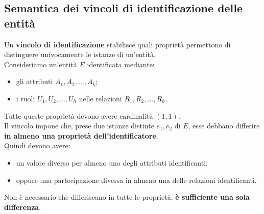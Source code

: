 \subsection*{Semantica dei vincoli di identificazione delle entità}

Un \textbf{vincolo di identificazione} stabilisce quali
proprietà permettono di distinguere univocamente
le istanze di un'entità.\\
Consideriamo un'entità $E$ identificata mediante:
\begin{itemize}
    \item gli attributi $A_1,A_2,\ldots,A_k$;
    \item i ruoli $U_1,U_2,\ldots,U_h$ nelle relazioni
    $R_1,R_2,\ldots,R_h$.
\end{itemize}
\noindent
Tutte queste proprietà devono avere cardinalità $(1,1)$.\\
Il vincolo impone che, prese due istanze distinte
$e_1,e_2$ di $E$, esse debbano differire
\textbf{in almeno una proprietà dell'identificatore}.\\
Quindi devono avere:
\begin{itemize}
    \item un valore diverso per almeno uno degli attributi
    identificanti;
    \item oppure una partecipazione diversa in almeno
    una delle relazioni identificanti.
\end{itemize}
\noindent
Non è necessario che differiscano in tutte le proprietà:
\textbf{è sufficiente una sola differenza}.
